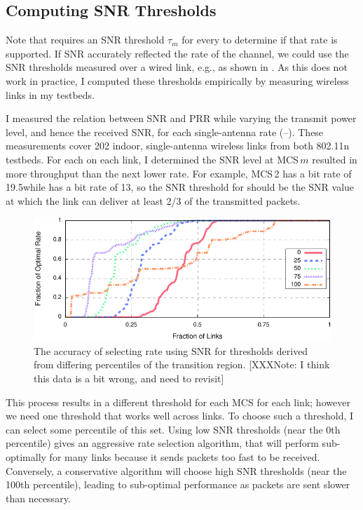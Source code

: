 \subsection{Computing SNR Thresholds}
Note that  requires an SNR threshold $\tau_m$ for every  to determine if that rate is supported. If SNR accurately reflected the rate of the channel, we could use the SNR thresholds measured over a wired link, e.g., as shown in . As this does not work in practice, I computed these thresholds empirically by measuring wireless links in my testbeds.

I measured the relation between SNR and PRR while varying the transmit power level, and hence the received SNR, for each single-antenna rate (--). These measurements cover 202 indoor, single-antenna wireless links from both 802.11n testbeds.
For each  on each link, I determined the SNR level at MCS\,$m$ resulted in more throughput than the next lower rate. For example, MCS\,2 has a bit rate of 19.5\Mbps while  has a bit rate of 13\Mbps, so the SNR threshold for  should be the SNR value at which the link can deliver at least 2/3 of the transmitted packets.

\begin{figure}[ht]
	\centering
	\includegraphics[width=\textwidth]{figures/thresh_vs_opt.pdf}
	\caption[The accuracy of selecting rate using SNR for thresholds derived from differing percentiles of the transition region.]{\label{fig:thresh_vs_opt}The accuracy of selecting rate using SNR for thresholds derived from differing percentiles of the transition region. [XXXNote: I think this data is a bit wrong, and need to revisit]}
\end{figure}

This process results in a different threshold for each MCS for each link; however we need one threshold that works well across links. To choose such a threshold, I can select some percentile of this set. Using low SNR thresholds (near the 0th percentile) gives an aggressive rate selection algorithm, that will perform sub-optimally for many links because it sends packets too fast to be received. Conversely, a conservative algorithm will choose high SNR thresholds (near the 100th percentile), leading to sub-optimal performance as packets are sent slower than necessary.

